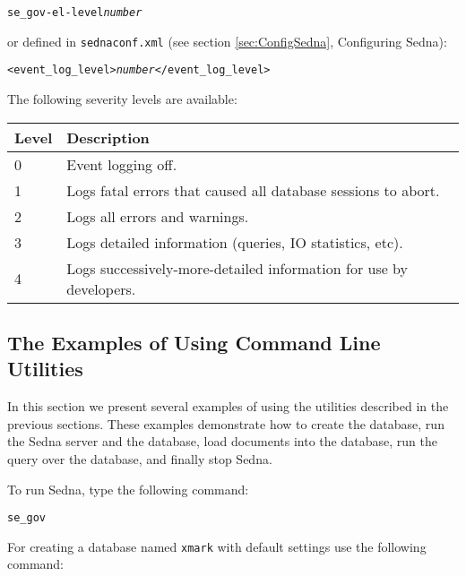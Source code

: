 \documentclass[a4paper,12pt]{article}
\begin{document}
\begin{alltt}
se_gov -el-level \emph{number}
\end{alltt}

or defined in \verb!sednaconf.xml! (see section \ref{sec:ConfigSedna},
Configuring Sedna):

\begin{alltt}
<event_log_level>\emph{number}</event_log_level>
\end{alltt}

The following severity levels are available:
\\
\begin{tabular}{|l|l|}
\hline
\hline
Level    & Description                                                        \\
\hline
\hline
0        & Event logging off.                                                 \\
\hline
1        & Logs fatal errors that caused all database sessions to abort.      \\
\hline
2        & Logs all errors and warnings.                                      \\
\hline
3        & Logs detailed information (queries, IO statistics, etc).           \\
\hline
4        & Logs successively-more-detailed information for use by developers. \\
\hline
\end{tabular}

\subsection{The Examples of Using Command Line Utilities}

In this section we present several examples of using the utilities described in
the previous sections. These examples demonstrate how to create the database,
run the Sedna server and the database, load documents into the database, run the
query over the database, and finally stop Sedna.

To run Sedna, type the following command:

\begin{verbatim}
se_gov
\end{verbatim}

For creating a database named \verb!xmark! with default settings use the
following command:
\end{document}
